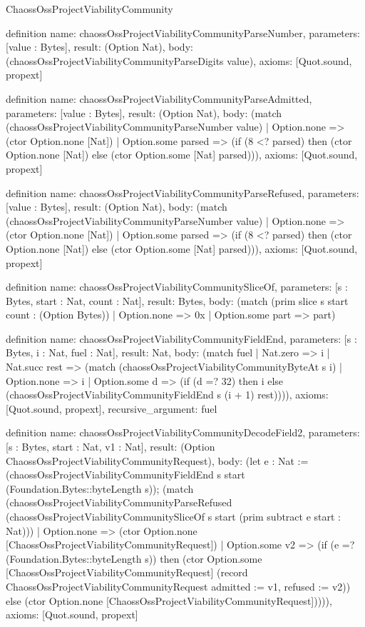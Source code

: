 \begin{lexlean}{ChaossOssProjectViabilityCommunity}
\begin{semanticmodule}
definition{
  name: chaossOssProjectViabilityCommunityParseNumber,
  parameters: [value : Bytes],
  result: (Option Nat),
  body: (chaossOssProjectViabilityCommunityParseDigits value),
  axioms: [Quot.sound, propext]
}

definition{
  name: chaossOssProjectViabilityCommunityParseAdmitted,
  parameters: [value : Bytes],
  result: (Option Nat),
  body: (match (chaossOssProjectViabilityCommunityParseNumber value)
    | Option.none => (ctor Option.none [Nat])
    | Option.some parsed => (if (8 <? parsed) then (ctor Option.none [Nat]) else (ctor Option.some [Nat] parsed))),
  axioms: [Quot.sound, propext]
}

definition{
  name: chaossOssProjectViabilityCommunityParseRefused,
  parameters: [value : Bytes],
  result: (Option Nat),
  body: (match (chaossOssProjectViabilityCommunityParseNumber value)
    | Option.none => (ctor Option.none [Nat])
    | Option.some parsed => (if (8 <? parsed) then (ctor Option.none [Nat]) else (ctor Option.some [Nat] parsed))),
  axioms: [Quot.sound, propext]
}

definition{
  name: chaossOssProjectViabilityCommunitySliceOf,
  parameters: [s : Bytes, start : Nat, count : Nat],
  result: Bytes,
  body: (match (prim slice s start count : (Option Bytes))
    | Option.none => 0x
    | Option.some part => part)
}

definition{
  name: chaossOssProjectViabilityCommunityFieldEnd,
  parameters: [s : Bytes, i : Nat, fuel : Nat],
  result: Nat,
  body: (match fuel
    | Nat.zero => i
    | Nat.succ rest => (match (chaossOssProjectViabilityCommunityByteAt s i)
      | Option.none => i
      | Option.some d => (if (d =? 32) then i else (chaossOssProjectViabilityCommunityFieldEnd s (i + 1) rest)))),
  axioms: [Quot.sound, propext],
  recursive_argument: fuel
}

definition{
  name: chaossOssProjectViabilityCommunityDecodeField2,
  parameters: [s : Bytes, start : Nat, v1 : Nat],
  result: (Option ChaossOssProjectViabilityCommunityRequest),
  body: (let e : Nat := (chaossOssProjectViabilityCommunityFieldEnd s start (Foundation.Bytes::byteLength s)); (match (chaossOssProjectViabilityCommunityParseRefused (chaossOssProjectViabilityCommunitySliceOf s start (prim subtract e start : Nat)))
    | Option.none => (ctor Option.none [ChaossOssProjectViabilityCommunityRequest])
    | Option.some v2 => (if (e =? (Foundation.Bytes::byteLength s)) then (ctor Option.some [ChaossOssProjectViabilityCommunityRequest] (record ChaossOssProjectViabilityCommunityRequest {admitted := v1, refused := v2})) else (ctor Option.none [ChaossOssProjectViabilityCommunityRequest])))),
  axioms: [Quot.sound, propext]
}


\end{semanticmodule}
\end{lexlean}
